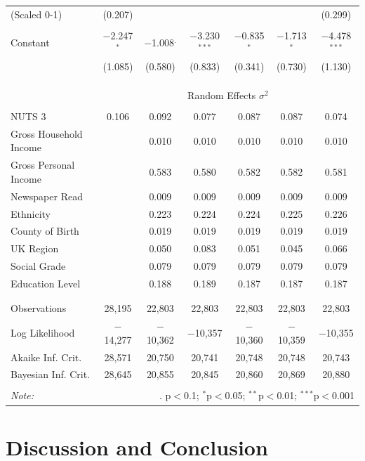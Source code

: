 \documentclass{article}
\begin{document}
\begin{table}[!htbp]
\begin{tabular}{@{\extracolsep{5pt}}lcccccc}
 (Scaled 0-1) & (0.207) &  &  &  &  & (0.299) \\ 
  & & & & & & \\ 
 Constant & $-$2.247$^{*}$ & $-$1.008$^{.}$ & $-$3.230$^{***}$ & $-$0.835$^{*}$ & $-$1.713$^{*}$ & $-$4.478$^{***}$ \\ 
  & (1.085) & (0.580) & (0.833) & (0.341) & (0.730) & (1.130) \\ 
  & & & & & & \\ 
\hline \\[-1.8ex] 
\\[-1.8ex] & \multicolumn{6}{c}{Random Effects $\sigma^2$} \\ 
  & & & & & & \\
NUTS 3 & 0.106 & 0.092 & 0.077 & 0.087 & 0.087 & 0.074 \\
Gross Household Income & & 0.010 & 0.010 & 0.010 & 0.010 & 0.010 \\
Gross Personal Income & & 0.583 & 0.580 & 0.582 & 0.582 & 0.581 \\
Newspaper Read & & 0.009 & 0.009 & 0.009 & 0.009 & 0.009 \\
Ethnicity & & 0.223 & 0.224 & 0.224 & 0.225 & 0.226 \\
County of Birth & & 0.019 & 0.019 & 0.019 & 0.019 & 0.019 \\
UK Region & & 0.050 & 0.083 & 0.051 & 0.045 & 0.066 \\
Social Grade & & 0.079 & 0.079 & 0.079 & 0.079 & 0.079 \\
Education Level & & 0.188 & 0.189 & 0.187 & 0.187 & 0.187 \\
  & & & & & & \\ 
\hline \\[-1.8ex] 
Observations & 28,195 & 22,803 & 22,803 & 22,803 & 22,803 & 22,803 \\ 
Log Likelihood & $-$14,277 & $-$10,362 & $-$10,357 & $-$10,360 & $-$10,359 & $-$10,355 \\ 
Akaike Inf. Crit. & 28,571 & 20,750 & 20,741 & 20,748 & 20,748 & 20,743 \\ 
Bayesian Inf. Crit. & 28,645 & 20,855 & 20,845 & 20,860 & 20,869 & 20,880 \\ 
\hline 
\hline \\[-1.8ex] 
\textit{Note:}  & \multicolumn{6}{r}{$.$ p$<$0.1; $^{*}$p$<$0.05; $^{**}$p$<$0.01; $^{***}$p$<$0.001} \\ 
\end{tabular} 
\end{table}

\hypertarget{discussion-and-conclusion}{%
\section{Discussion and Conclusion}\label{discussion-and-conclusion}}
\end{document}
